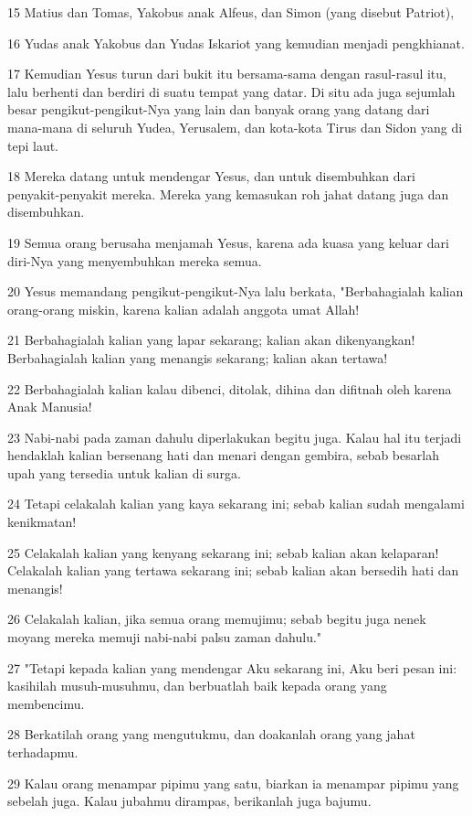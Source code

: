 \par 15 Matius dan Tomas, Yakobus anak Alfeus, dan Simon (yang disebut Patriot),
\par 16 Yudas anak Yakobus dan Yudas Iskariot yang kemudian menjadi pengkhianat.
\par 17 Kemudian Yesus turun dari bukit itu bersama-sama dengan rasul-rasul itu, lalu berhenti dan berdiri di suatu tempat yang datar. Di situ ada juga sejumlah besar pengikut-pengikut-Nya yang lain dan banyak orang yang datang dari mana-mana di seluruh Yudea, Yerusalem, dan kota-kota Tirus dan Sidon yang di tepi laut.
\par 18 Mereka datang untuk mendengar Yesus, dan untuk disembuhkan dari penyakit-penyakit mereka. Mereka yang kemasukan roh jahat datang juga dan disembuhkan.
\par 19 Semua orang berusaha menjamah Yesus, karena ada kuasa yang keluar dari diri-Nya yang menyembuhkan mereka semua.
\par 20 Yesus memandang pengikut-pengikut-Nya lalu berkata, "Berbahagialah kalian orang-orang miskin, karena kalian adalah anggota umat Allah!
\par 21 Berbahagialah kalian yang lapar sekarang; kalian akan dikenyangkan! Berbahagialah kalian yang menangis sekarang; kalian akan tertawa!
\par 22 Berbahagialah kalian kalau dibenci, ditolak, dihina dan difitnah oleh karena Anak Manusia!
\par 23 Nabi-nabi pada zaman dahulu diperlakukan begitu juga. Kalau hal itu terjadi hendaklah kalian bersenang hati dan menari dengan gembira, sebab besarlah upah yang tersedia untuk kalian di surga.
\par 24 Tetapi celakalah kalian yang kaya sekarang ini; sebab kalian sudah mengalami kenikmatan!
\par 25 Celakalah kalian yang kenyang sekarang ini; sebab kalian akan kelaparan! Celakalah kalian yang tertawa sekarang ini; sebab kalian akan bersedih hati dan menangis!
\par 26 Celakalah kalian, jika semua orang memujimu; sebab begitu juga nenek moyang mereka memuji nabi-nabi palsu zaman dahulu."
\par 27 "Tetapi kepada kalian yang mendengar Aku sekarang ini, Aku beri pesan ini: kasihilah musuh-musuhmu, dan berbuatlah baik kepada orang yang membencimu.
\par 28 Berkatilah orang yang mengutukmu, dan doakanlah orang yang jahat terhadapmu.
\par 29 Kalau orang menampar pipimu yang satu, biarkan ia menampar pipimu yang sebelah juga. Kalau jubahmu dirampas, berikanlah juga bajumu.
